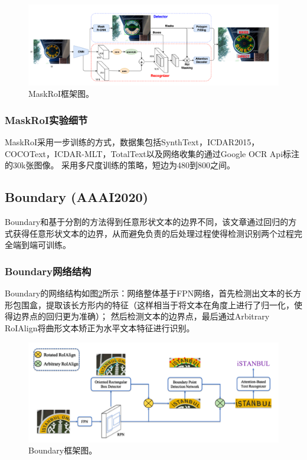 \begin{figure}[htb]
    \centering
    \includegraphics[width=.98\textwidth]{figure/spotting/maskroi_framework.png} 
    \caption{MaskRoI框架图。} 
    \label{maskroi_framework} 
\end{figure}

\subsubsection{MaskRoI实验细节}
MaskRoI采用一步训练的方式，数据集包括SynthText，ICDAR2015，COCOText，ICDAR-MLT，TotalText以及网络收集的通过Google OCR Api标注的30k张图像。
采用多尺度训练的策略，短边为480到800之间。

\subsection{Boundary (AAAI2020)}
Boundary\cite{wang2019all}和基于分割的方法得到任意形状文本的边界不同，该文章通过回归的方式获得任意形状文本的边界，从而避免负责的后处理过程使得检测识别两个过程完全端到端可训练。
\subsubsection{Boundary网络结构}
Boundary的网络结构如图\ref{boundary_framework}所示：网络整体基于FPN网络，首先检测出文本的长方形包围盒，提取该长方形内的特征（这样相当于将文本在角度上进行了归一化，使得边界点的回归更为准确）；
然后检测文本的边界点，最后通过Arbitrary RoIAlign将曲形文本矫正为水平文本特征进行识别。
\begin{figure}[H]
    \centering
    \includegraphics[width=.98\textwidth]{figure/spotting/boundary_framework.png} 
    \caption{Boundary框架图。} 
    \label{boundary_framework} 
\end{figure}

